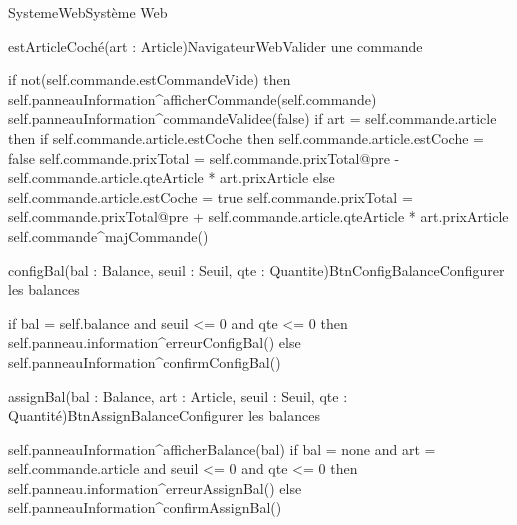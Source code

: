 \begin{OM}{SystemeWeb}{Système Web}
    \begin{OMOperation}{estArticleCoché(art : Article)}{NavigateurWeb}{Valider une commande}
        \begin{OMMessages}
        \end{OMMessages}
        \OMNoPre
        \begin{OMPost}
if not(self.commande.estCommandeVide) then
    self.panneauInformation^afficherCommande(self.commande)
    self.panneauInformation^commandeValidee(false)
    if art = self.commande.article then
        if self.commande.article.estCoche then
            self.commande.article.estCoche = false
            self.commande.prixTotal = self.commande.prixTotal@pre - self.commande.article.qteArticle * art.prixArticle
        else
            self.commande.article.estCoche = true
            self.commande.prixTotal = self.commande.prixTotal@pre + self.commande.article.qteArticle * art.prixArticle
            self.commande^majCommande()
        \end{OMPost}
    \end{OMOperation}

    \begin{OMOperation}{configBal(bal : Balance, seuil : Seuil, qte : Quantite)}{BtnConfigBalance}{Configurer les balances}
        \begin{OMMessages}
        \end{OMMessages}
        \OMNoPre
        \begin{OMPost}
if bal = self.balance and seuil <= 0 and qte <= 0 then
    self.panneau.information^erreurConfigBal()
else
    self.panneauInformation^confirmConfigBal()
        \end{OMPost}
    \end{OMOperation}

    \begin{OMOperation}{assignBal(bal : Balance, art : Article, seuil : Seuil, qte : Quantité)}{BtnAssignBalance}{Configurer les balances}
        \begin{OMMessages}
        \end{OMMessages}
        \OMNoPre
        \begin{OMPost}
self.panneauInformation^afficherBalance(bal)
if bal = none and art = self.commande.article and seuil <= 0 and qte <= 0 then
    self.panneau.information^erreurAssignBal()
else
    self.panneauInformation^confirmAssignBal()
        \end{OMPost}
    \end{OMOperation}
\end{OM}
